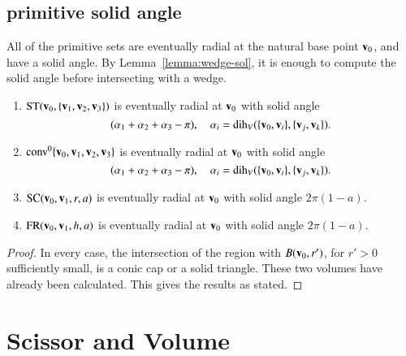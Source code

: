 \subsection{primitive solid angle}

All of the primitive sets are eventually radial at the natural
base point ${\mathbf v}_0$, and have a
solid angle.  By Lemma~\ref{lemma:wedge-sol}, it is enough to compute
the solid angle before intersecting with a wedge.
%

\begin{lemma} 
\begin{enumerate}
    \item  ${\operatorname{ST}}({\mathbf v}_0,\{{\mathbf v}_1,{\mathbf v}_2,{\mathbf v}_3\})$ is eventually radial at ${\mathbf v}_0$
     with solid angle 
     \begin{displaymath}
     (\alpha_1+\alpha_2+\alpha_3-\pi),\quad
     \alpha_i=\operatorname{dih}_V(\{{\mathbf v}_0,{\mathbf v}_i\},\{{\mathbf v}_j,{\mathbf v}_k\}).
     \end{displaymath}
    \item ${\operatorname{conv}}^0\{{\mathbf v}_0,{\mathbf v}_1,{\mathbf v}_2,{\mathbf v}_3\}$ is eventually radial at ${\mathbf v}_0$
      with solid angle
           \begin{displaymath}
     (\alpha_1+\alpha_2+\alpha_3-\pi),\quad
     \alpha_i=\operatorname{dih}_V(\{{\mathbf v}_0,{\mathbf v}_i\},\{{\mathbf v}_j,{\mathbf v}_k\}).
     \end{displaymath}
    \item ${\operatorname{SC}}({\mathbf v}_0,{\mathbf v}_1,r,a)$ is eventually radial at ${\mathbf v}_0$ with solid
      angle 
      $2\pi(1-a)$.
    \item ${\operatorname{FR}}({\mathbf v}_0,{\mathbf v}_1,h,a)$ is eventually radial at ${\mathbf v}_0$ with solid
      angle        $2\pi (1-a)$.
%
\end{enumerate}
\end{lemma}
%

%
%
%
%

\begin{proof} In every case, the intersection of 
  the region with $B({\mathbf v}_0,r')$, for $r'>0$ sufficiently small, is
  a conic cap or a solid triangle.  These two volumes have
  already been calculated.  This gives the results as stated.
\end{proof}


\section{Scissor and Volume}

